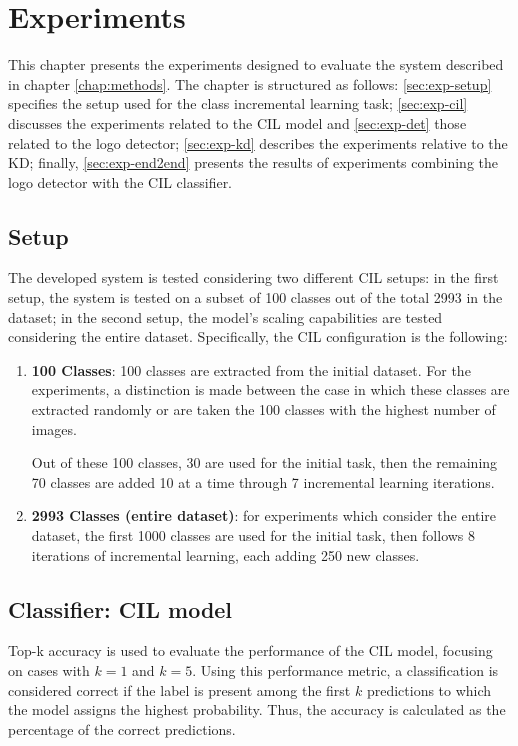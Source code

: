 \chapter{Experiments}
\label{chap:experiments}
This chapter presents the experiments designed to evaluate the system described in chapter \autoref{chap:methods}.
The chapter is structured as follows: \autoref{sec:exp-setup} specifies the setup used for the class incremental learning task; \autoref{sec:exp-cil} discusses the experiments related to the CIL model and \autoref{sec:exp-det} those related to the logo detector; \autoref{sec:exp-kd} describes the experiments relative to the KD; finally, \autoref{sec:exp-end2end} presents the results of experiments combining the logo detector with the CIL classifier.

\section{Setup}
\label{sec:exp-setup}
The developed system is tested considering two different CIL setups: in the first setup, the system is tested on a subset of 100 classes out of the total 2993 in the dataset; in the second setup, the model's scaling capabilities are tested considering the entire dataset. Specifically, the CIL configuration is the following:
\begin{enumerate}
    \item \textbf{100 Classes}: 100 classes are extracted from the initial dataset. For the experiments, a distinction is made between the case in which these classes are extracted randomly or are taken the 100 classes with the highest number of images.
    
    Out of these 100 classes, 30 are used for the initial task, then the remaining 70 classes are added 10 at a time through 7 incremental learning iterations.

    \item \textbf{2993 Classes (entire dataset)}: for experiments which consider the entire dataset, the first 1000 classes are used for the initial task, then follows 8 iterations of incremental learning, each adding 250 new classes.
\end{enumerate}

\section{Classifier: CIL model}
\label{sec:exp-cil}
Top-k accuracy is used to evaluate the performance of the CIL model, focusing on cases with $k=1$ and $k=5$.
Using this performance metric, a classification is considered correct if the label is present among the first $k$ predictions to which the model assigns the highest probability. Thus, the accuracy is calculated as the percentage of the correct predictions.

